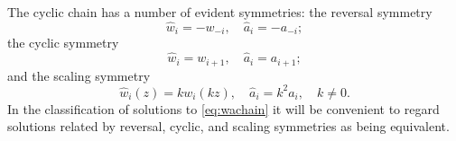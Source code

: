 \documentclass{amsart}
\theoremstyle{definition}
\newcommand{\ha}{\hat{a}}
\newcommand{\hw}{\hat{w}}
\begin{document}
The cyclic chain has a number of evident symmetries: the
reversal symmetry
\begin{equation}
  \label{eq:reversal2}
  \hw_i = -w_{-i},\quad \ha_i = -a_{-i};
\end{equation}
the cyclic symmetry
\begin{equation}
  \label{eq:cyclicgen}
  \hw_i = w_{i + 1},\quad \ha_i= a_{i+1};
\end{equation}
and the scaling symmetry
\begin{equation}
  \label{eq:wscale}
  \hw_i(z) = k w_i(kz),\quad \ha_i = k^2
  a_i,\quad k\neq 0.
\end{equation}
In the
classification of solutions to \eqref{eq:wachain} it will be
convenient to regard solutions related by reversal, cyclic, and
scaling symmetries as being equivalent.
\end{document}
